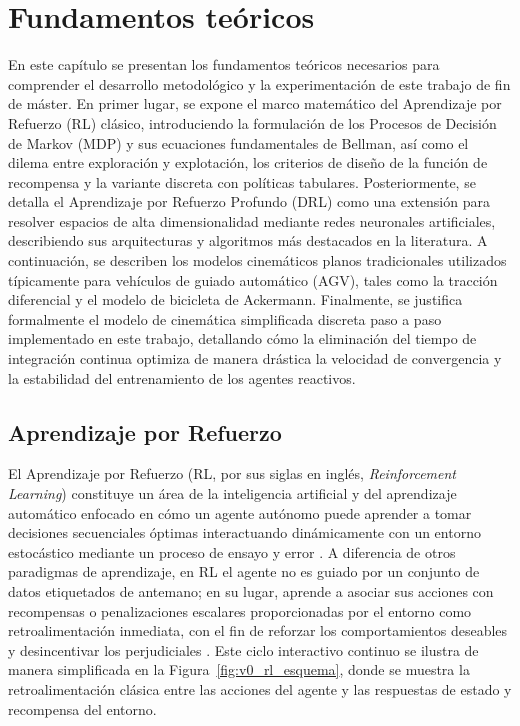 \chapter{Fundamentos teóricos}
En este capítulo se presentan los fundamentos teóricos necesarios para comprender el desarrollo metodológico y la experimentación de este trabajo de fin de máster. En primer lugar, se expone el marco matemático del Aprendizaje por Refuerzo (RL) clásico, introduciendo la formulación de los Procesos de Decisión de Markov (MDP) y sus ecuaciones fundamentales de Bellman, así como el dilema entre exploración y explotación, los criterios de diseño de la función de recompensa y la variante discreta con políticas tabulares. Posteriormente, se detalla el Aprendizaje por Refuerzo Profundo (DRL) como una extensión para resolver espacios de alta dimensionalidad mediante redes neuronales artificiales, describiendo sus arquitecturas y algoritmos más destacados en la literatura. A continuación, se describen los modelos cinemáticos planos tradicionales utilizados típicamente para vehículos de guiado automático (AGV), tales como la tracción diferencial y el modelo de bicicleta de Ackermann. Finalmente, se justifica formalmente el modelo de cinemática simplificada discreta paso a paso implementado en este trabajo, detallando cómo la eliminación del tiempo de integración continua optimiza de manera drástica la velocidad de convergencia y la estabilidad del entrenamiento de los agentes reactivos.

\section{Aprendizaje por Refuerzo}
El Aprendizaje por Refuerzo (RL, por sus siglas en inglés, \textit{Reinforcement Learning}) constituye un área de la inteligencia artificial y del aprendizaje automático enfocado en cómo un agente autónomo puede aprender a tomar decisiones secuenciales óptimas interactuando dinámicamente con un entorno estocástico mediante un proceso de ensayo y error \citep{shakya2023reinforcement}. A diferencia de otros paradigmas de aprendizaje, en RL el agente no es guiado por un conjunto de datos etiquetados de antemano; en su lugar, aprende a asociar sus acciones con recompensas o penalizaciones escalares proporcionadas por el entorno como retroalimentación inmediata, con el fin de reforzar los comportamientos deseables y desincentivar los perjudiciales \citep{murphy2025reinforcement}. Este ciclo interactivo continuo se ilustra de manera simplificada en la Figura~\ref{fig:v0_rl_esquema}, donde se muestra la retroalimentación clásica entre las acciones del agente y las respuestas de estado y recompensa del entorno.


